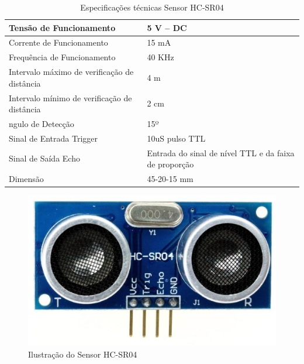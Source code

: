 \begin{table}[h]
\centering
\caption{Especificações técnicas Sensor HC-SR04}
\resizebox{\textwidth}{!} {
\label{table2}
\begin{tabular}{|l|l|}
\hline
Tensão de Funcionamento                      & 5 V – DC                                              \\ \hline
Corrente de Funcionamento                    & 15 mA                                                 \\ \hline
Frequência de Funcionamento                  & 40 KHz                                                \\ \hline
Intervalo máximo de verificação de distância & 4 m                                                   \\ \hline
Intervalo mínimo de verificação de distância & 2 cm                                                  \\ \hline
ngulo de Detecção                            & 15º                                                   \\ \hline
Sinal de Entrada Trigger                     & 10uS pulso TTL                                        \\ \hline
Sinal de Saída Echo                          & Entrada do sinal de nível TTL e da faixa de proporção \\ \hline
Dimensão                                     & 45-20-15 mm                                           \\ \hline
\end{tabular}
}
\end{table}

\begin{figure}[h]
	\centering
	\includegraphics[keepaspectratio=true,scale=0.2]{figuras/sensor1.eps}
	\caption{Ilustração do Sensor HC-SR04}
	\label{sensor1}
\end{figure}

